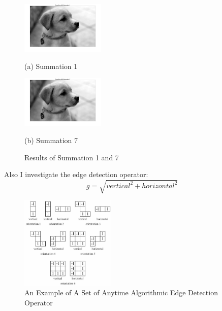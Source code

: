 \documentclass[twocolumn]{article}
\begin{document}
\begin{figure}[H]
\begin{minipage}{0.48\linewidth}
  \centerline{\includegraphics[width=4.0cm]{sum1.jpg}}
  \centerline{(a) Summation 1}
\end{minipage}
\hfill
\begin{minipage}{0.48\linewidth}
  \centerline{\includegraphics[width=4.0cm]{sum7.jpg}}
  \centerline{(b) Summation 7}
\end{minipage}
 \caption{Results of Summation 1 and 7}
\end{figure}

Also I investigate the edge detection operator:
\begin{equation*}
g = \sqrt{vertical^2+horizontal^2}
\end{equation*}

\begin{figure}[H]
\centering
  \includegraphics[width=0.4\textwidth]{orientation.jpg}
\caption{An Example of A Set of Anytime Algorithmic Edge Detection Operator}
\end{figure}

\begin{table}[h!]
\centering
{}
\caption{Performance with Different Detection Operator}
\end{table}
\end{document}
